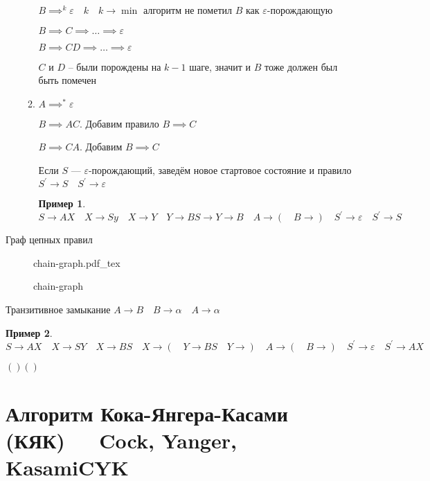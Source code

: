 \documentclass{book}
\newcommand{\p}[1]{#1^{\prime}}
\theoremstyle{definition}
\newtheorem*{example}{Пример}
\newcommand{\incfig}[1]{%
    \def\svgwidth{\columnwidth}
    {#1.pdf_tex}
}
\begin{document}
\begin{enumerate}
\begin{enumerate}
                $B\implies ^k \varepsilon\quad k\quad k\to \min$ алгоритм не пометил $B$ как  $\varepsilon$-порождающую

                $B\implies C\implies \ldots\implies \varepsilon$

                $B\implies CD \implies \ldots \implies \varepsilon$ 

                $C$ и  $D$ --  были порождены на $k-1$ шаге, значит и  $B$ тоже должен был быть помечен 
            \item $A \implies ^* \varepsilon$

                $B\implies AC$. Добавим правило $B \implies C$

                $B \implies CA$. Добавим $B\implies C$

                 Если  $S$ ---  $\varepsilon$-порождающий, заведём новое стартовое состояние и правило $\p S \to S\quad \p S \to \varepsilon$

                 \begin{example}
                     $S \to AX\quad X \to Sy \quad X \to Y\quad Y \to BS \to Y \to B\quad A \to (\quad B \to )\quad \p S \to \varepsilon\quad \p S \to S$
                 \end{example}


        \end{enumerate}
\end{enumerate}

Граф цепных правил

\begin{figure}[!ht]
    \centering
    \incfig{chain-graph}
    \caption{chain-graph}
    \label{fig:chain-graph}
\end{figure}

Транзитивное замыкание $A \to B\quad B \to \alpha\quad A\to \alpha$

\begin{example}
    $S \to AX\quad X \to SY\quad X \to BS\quad X\to (\quad Y \to BS\quad Y \to )\quad A \to (\quad B \to )\quad \p S \to \varepsilon\quad \p S \to AX$

    $\left(  \right) \left(  \right) $

\end{example}

\section{Алгоритм Кока-Янгера-Касами (КЯК) $\quad $ Cock, Yanger, Kasami\quad CYK}
\end{document}
